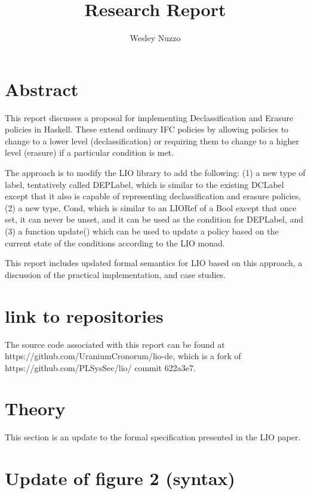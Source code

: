 \documentclass[11pt, oneside]{article}   	%
\title{Research Report}
\author{Wesley Nuzzo}
\begin{document}
\maketitle

\section{Abstract}

This report discusses a proposal for implementing Declassification and Erasure policies in Haskell. 
These extend ordinary IFC policies by allowing policies to change to a lower level (declassification) or requiring them to change to a higher level (erasure) if a particular condition is met. 

The approach is to modify the LIO library to add the following: (1) a new type of label, tentatively called DEPLabel, which is similar to the existing DCLabel except that it also is capable of representing declassification and erasure policies, (2) a new type, Cond, which is similar to an LIORef of a Bool except that once set, it can never be unset, and it can be used as the condition for DEPLabel, and (3) a function update() which can be used to update a policy based on the current state of the conditions according to the LIO monad.

This report includes updated formal semantics for LIO based on this approach, a discussion of the practical implementation, and case studies.

\section{link to repositories}
The source code associated with this report can be found at https://github.com/UraniumCronorum/lio-de, which is a fork of https://github.com/PLSysSec/lio/ commit 622a3e7. 

\break
\section {Theory}
This section is an update to the formal specification presented in the LIO paper.

\section{Update of figure 2 (syntax)} 
\noindent 
\end{document}
